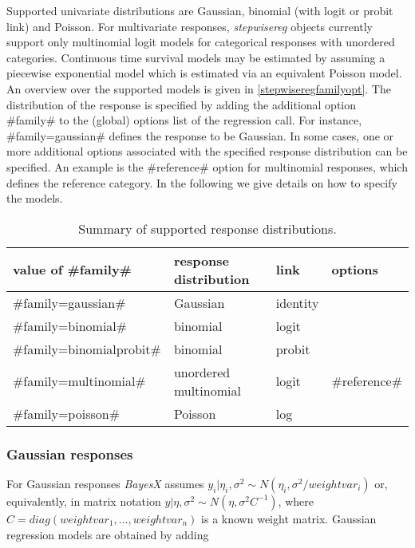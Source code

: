 Supported univariate distributions are Gaussian, binomial (with
logit or probit link) and Poisson. For
multivariate responses, {\em stepwisereg} objects currently support only
multinomial logit models for categorical responses with unordered categories.
Continuous time survival models may be estimated by assuming a piecewise exponential model which
is estimated via an equivalent Poisson model.
An overview over
the supported models is given in \autoref{stepwiseregfamilyopt}. The
distribution of the response is specified by adding the additional
option #family# to the (global) options list of the regression call.
For instance, #family=gaussian# defines the response to be Gaussian.
In some cases, one or more additional options
associated with the specified response distribution can be
specified. An example is the #reference# option for multinomial
responses, which defines the reference category. In the following we
give details on how to specify the models.

\begin{table}[ht]
\begin{center}
\begin{tabular} {|l|p{5cm}|p{2.7cm}|p{1.7cm}|}
 \hline
 value of #family# & response distribution & link & options \\
 \hline
 \hline
 #family=gaussian#            & Gaussian              & identity & \\
 \hline
 #family=binomial#            & binomial              & logit & \\
 #family=binomialprobit#      & binomial              & probit & \\
 \hline
 #family=multinomial#         & unordered multinomial & logit & #reference#\\
 \hline
 #family=poisson#             & Poisson               & log & \\
\hline
\end{tabular}
{\em \caption {\label{stepwiseregfamilyopt} Summary of supported response distributions.}}
\end{center}
\end{table}

\subsubsection*{Gaussian responses}

For Gaussian responses {\em BayesX} assumes $y_i | \eta_i,\sigma^2
\sim N(\eta_i,\sigma^2/weightvar_i)$ or, equivalently, in matrix
notation $y | \eta, \sigma^2 \sim N(\eta,\sigma^2C^{-1})$, where
$C=diag(weightvar_1,\dots,weightvar_n)$ is a known weight matrix.
Gaussian regression models are obtained by adding

